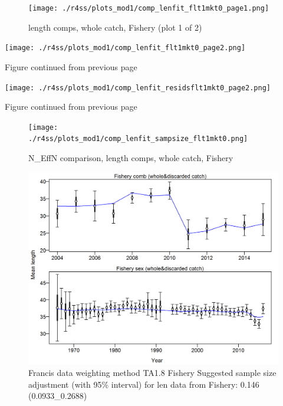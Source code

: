 \documentclass[12pt,]{article}
\begin{document}
\begin{figure}
\centering
\texttt{[image: ./r4ss/plots\_mod1/comp\_lenfit\_flt1mkt0\_page1.png]}
\caption{length comps, whole catch, Fishery (plot 1 of 2)
\label{fig:mod1_5_comp_lenfit_flt1mkt0_page1}}
\end{figure}

\texttt{[image: ./r4ss/plots\_mod1/comp\_lenfit\_flt1mkt0\_page2.png]}

\begin{center} 

              Figure continued from previous page 

             \end{center}

\texttt{[image: ./r4ss/plots\_mod1/comp\_lenfit\_residsflt1mkt0\_page2.png]}

\begin{center} 

              Figure continued from previous page 

             \end{center}

\begin{figure}
\centering
\texttt{[image: ./r4ss/plots\_mod1/comp\_lenfit\_sampsize\_flt1mkt0.png]}
\caption{N\_EffN comparison, length comps, whole catch, Fishery
\label{fig:mod1_8_comp_lenfit_sampsize_flt1mkt0}}
\end{figure}

\begin{figure}
\centering
\includegraphics{./r4ss/plots_mod1/comp_lenfit_data_weighting_TA1.8_Fishery.png}
\caption{Francis data weighting method TA1.8 Fishery Suggested sample
size adjustment (with 95\% interval) for len data from Fishery: 0.146
(0.0933\_0.2688)
\label{fig:mod1_9_comp_lenfit_data_weighting_TA1.8_Fishery}}
\end{figure}
\end{document}
